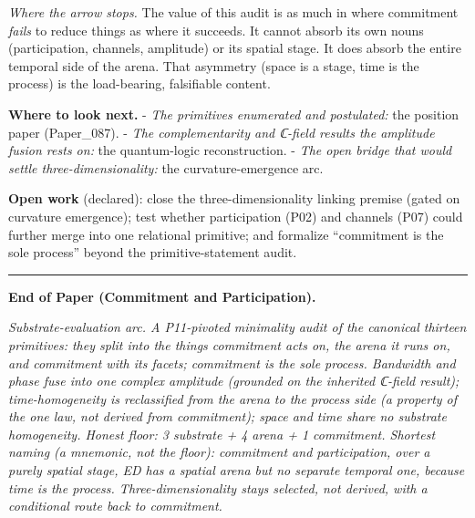 \documentclass[
  11pt,
]{article}
\begin{document}
\emph{Where the arrow stops.} The value of this audit is as much in
where commitment \emph{fails} to reduce things as where it succeeds. It
cannot absorb its own nouns (participation, channels, amplitude) or its
spatial stage. It does absorb the entire temporal side of the arena.
That asymmetry (space is a stage, time is the process) is the
load-bearing, falsifiable content.

\textbf{Where to look next.} - \emph{The primitives enumerated and
postulated:} the position paper (Paper\_087). - \emph{The
complementarity and ℂ-field results the amplitude fusion rests on:} the
quantum-logic reconstruction. - \emph{The open bridge that would settle
three-dimensionality:} the curvature-emergence arc.

\textbf{Open work} (declared): close the three-dimensionality linking
premise (gated on curvature emergence); test whether participation (P02)
and channels (P07) could further merge into one relational primitive;
and formalize ``commitment is the sole process'' beyond the
primitive-statement audit.

\begin{center}\rule{0.5\linewidth}{0.5pt}\end{center}

\textbf{End of Paper (Commitment and Participation).}

\emph{Substrate-evaluation arc. A P11-pivoted minimality audit of the
canonical thirteen primitives: they split into the things commitment
acts on, the arena it runs on, and commitment with its facets;
commitment is the sole process. Bandwidth and phase fuse into one
complex amplitude (grounded on the inherited ℂ-field result);
time-homogeneity is reclassified from the arena to the process side (a
property of the one law, not derived from commitment); space and time
share no substrate homogeneity. Honest floor: 3 substrate + 4 arena + 1
commitment. Shortest naming (a mnemonic, not the floor): commitment and
participation, over a purely spatial stage, ED has a spatial arena but
no separate temporal one, because time is the process.
Three-dimensionality stays selected, not derived, with a conditional
route back to commitment.}
\end{document}
